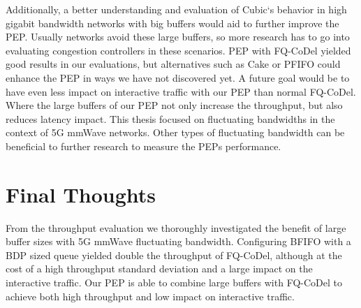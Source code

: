 \documentclass[a4paper,english, 11pt]{report}
\begin{document}
Additionally, a better understanding and evaluation of Cubic`s behavior in high gigabit bandwidth networks with big buffers would aid to further improve the PEP. Usually networks avoid these large buffers, so more research has to go into evaluating congestion controllers in these scenarios. PEP with FQ-CoDel yielded good results in our evaluations, but alternatives such as Cake or PFIFO could enhance the PEP in ways we have not discovered yet. A future goal would be to have even less impact on interactive traffic with our PEP than normal FQ-CoDel. Where the large buffers of our PEP not only increase the throughput, but also reduces latency impact.
This thesis focused on fluctuating bandwidths in the context of 5G mmWave networks. Other types of fluctuating bandwidth can be beneficial to further research to measure the PEPs performance.\\

\section{Final Thoughts}
From the throughput evaluation we thoroughly investigated the benefit of large buffer sizes with 5G mmWave fluctuating bandwidth. Configuring BFIFO with a BDP sized queue yielded double the throughput of FQ-CoDel, although at the cost of a high throughput standard deviation and a large impact on the interactive traffic. Our PEP is able to combine large buffers with FQ-CoDel to achieve both high throughput and low impact on interactive traffic.\\

{}

\end{document}
